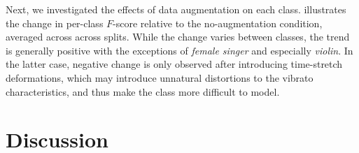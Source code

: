 \documentclass{article}
\begin{document}
Next, we investigated the effects of data augmentation on each class.
 illustrates the change in per-class $F$-score relative to the
no-augmentation condition, averaged across across splits.
While the change varies between classes, the trend is generally positive
with the exceptions of \emph{female singer} and especially \emph{violin}.
In the latter case, negative change is only observed after introducing time-stretch
deformations, which may introduce unnatural distortions to the vibrato characteristics,
and thus make the class more difficult to model.

\section{Discussion}



\end{document}
